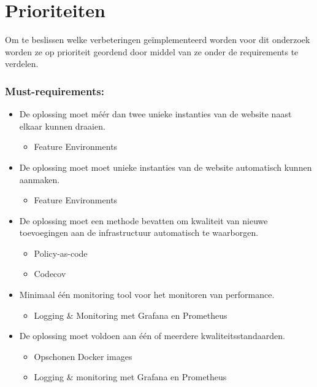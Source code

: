 \section{Prioriteiten}
Om te beslissen welke verbeteringen geïmplementeerd worden voor dit onderzoek worden ze op prioriteit geordend door middel van ze onder de requirements te verdelen.


\subsubsection{Must-requirements:}
\begin{itemize}
	\item De oplossing moet méér dan twee unieke instanties van de website naast elkaar kunnen draaien.
	\begin{itemize}
		\item Feature Environments
	\end{itemize}
	
	\item De oplossing moet moet unieke instanties van de website automatisch kunnen aanmaken.
	\begin{itemize}
		\item Feature Environments
	\end{itemize}

	\item De oplossing moet een methode bevatten om kwaliteit van nieuwe toevoegingen aan de infrastructuur automatisch te waarborgen.
	\begin{itemize}
		\item Policy-as-code
		\item Codecov
	\end{itemize}

	\item Minimaal één monitoring tool voor het monitoren van performance.
	\begin{itemize}
		\item Logging \& Monitoring met Grafana en Prometheus
	\end{itemize}

	\item De oplossing moet voldoen aan één of meerdere kwaliteitsstandaarden.
	\begin{itemize}
		\item Opschonen Docker images
		\item Logging \& monitoring met Grafana en Prometheus
	\end{itemize}
\end{itemize}

